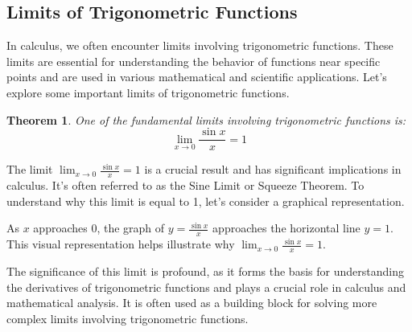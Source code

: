 \documentclass[a4paper,12pt]{book}
\newcounter{problem}
\newtheorem{theorem}{Theorem}
\begin{document}
\subsection{Limits of Trigonometric Functions}

In calculus, we often encounter limits involving trigonometric functions. These limits are essential for understanding the behavior of functions near specific points and are used in various mathematical and scientific applications. Let's explore some important limits of trigonometric functions.

\begin{theorem}
One of the fundamental limits involving trigonometric functions is:
\[
\lim_{{x \to 0}} \frac{\sin x}{x} = 1
\]
\end{theorem}

The limit \( \lim_{{x \to 0}} \frac{\sin x}{x} = 1 \) is a crucial result and has significant implications in calculus. It's often referred to as the Sine Limit or Squeeze Theorem. To understand why this limit is equal to 1, let's consider a graphical representation.

\begin{center}
\end{center}



As \(x\) approaches 0, the graph of \(y = \frac{\sin x}{x}\) approaches the horizontal line \(y = 1\). This visual representation helps illustrate why \( \lim_{{x \to 0}} \frac{\sin x}{x} = 1 \).

The significance of this limit is profound, as it forms the basis for understanding the derivatives of trigonometric functions and plays a crucial role in calculus and mathematical analysis. It is often used as a building block for solving more complex limits involving trigonometric functions.
\end{document}
